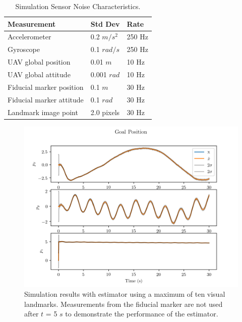 \begin{table}[h!]
  \begin{center}
    \caption{Simulation Sensor Noise Characteristics.}
    \label{tab:sim_meas_noise}
    \begin{tabular}{l|l|l}
      \textbf{Measurement} & \textbf{Std Dev} & \textbf{Rate} \\
      \hline
      Accelerometer & 0.2 $m/s^2$ & 250 Hz \\
      Gyroscope & 0.1 $rad/s$ & 250 Hz \\
      UAV global position & 0.01 $m$ & 10 Hz \\
      UAV global attitude & 0.001 $rad$ & 10 Hz \\
      Fiducial marker position & 0.1 $m$ & 30 Hz \\
      Fiducial marker attitude & 0.1 $rad$ & 30 Hz \\
      Landmark image point & 2.0 pixels & 30 Hz \\
    \end{tabular}
  \end{center}
\end{table}

\begin{figure}
  \centering
  \includegraphics[scale=0.5]{plots/with_lms_gp.png}
  \caption{Simulation results with estimator using a maximum of ten visual
  landmarks. Measurements from the fiducial marker are not used after $t$ = 5
$s$ to demonstrate the performance of the estimator.}
  \label{fig:with_lms_gp}
\end{figure}

